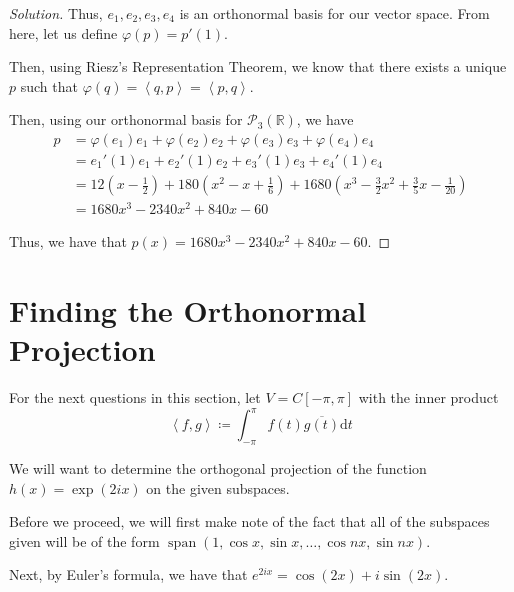 \documentclass{article}
\newenvironment{solution}{\begin{proof}[Solution]}{\end{proof}}
\newcommand{\RR}{\mathbb{R}}
\DeclareMathOperator*{\vspan}{\mathrm{span}}
\newcommand{\innerproduct}[2]{\left\langle{#1}, {#2}\right\rangle}
\begin{document}
\begin{solution}
		Thus, $e_{1}, e_{2}, e_{3}, e_{4}$ is an orthonormal basis for our vector space. From here, let us define $\varphi(p) = p'(1)$.
		
		Then, using Riesz's Representation Theorem, we know that there exists a unique $p$ such that $\varphi(q) = \innerproduct{q}{p} = \innerproduct{p}{q}$.
		
		Then, using our orthonormal basis for $\mathscr{P}_{3}(\RR)$, we have
		\begin{align*}
			p &= \varphi(e_{1})e_{1} + \varphi(e_{2})e_{2} + \varphi(e_{3})e_{3} + \varphi(e_{4})e_{4} \\
			&= e_{1}'(1)e_{1} + e_{2}'(1)e_{2} + e_{3}'(1)e_{3} + e_{4}'(1)e_{4} \\
			&= 12\left( x-\frac{1}{2} \right) + 180\left( x^{2} - x + \frac{1}{6} \right) + 1680\left( x^{3} - \frac{3}{2}x^{2} + \frac{3}{5}x - \frac{1}{20} \right) \\
			&= 1680x^{3} - 2340x^{2} + 840x - 60
		\end{align*}
		
		Thus, we have that $p(x) = 1680x^{3} - 2340x^{2} + 840x - 60$.
	\end{solution}
	
	\newpage
	
	\section{Finding the Orthonormal Projection}
	\begin{hw*}[Setup]
		For the next questions in this section, let $V = C[-\pi, \pi]$ with the inner product
		\begin{equation*}
			\innerproduct{f}{g} \coloneq \int_{-\pi}^{\pi} f(t)\overline{g(t)}\mathrm dt
		\end{equation*}
		
		We will want to determine the orthogonal projection of the function $h(x) = \exp(2ix)$ on the given subspaces.
	\end{hw*}
	
	Before we proceed, we will first make note of the fact that all of the subspaces given will be of the form $\vspan(1, \cos x, \sin x, \ldots, \cos nx, \sin nx)$.
	
	Next, by Euler's formula, we have that $e^{2ix} = \cos(2x) + i\sin(2x)$.
	
\end{document}
